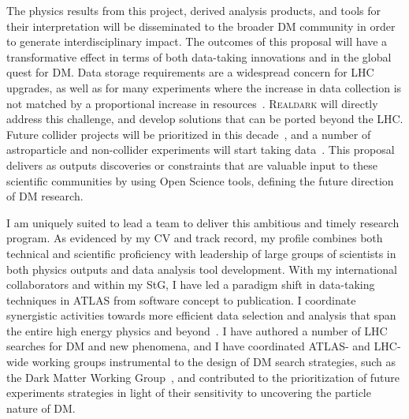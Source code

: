 \documentclass[11pt,a4paper]{article}
\begin{document}
The physics results from this project, derived analysis products, and tools for their interpretation will be disseminated to the broader DM community in order to generate interdisciplinary impact.
The outcomes of this proposal will have a transformative effect in terms of both data-taking innovations and in the global quest for DM. 
Data storage requirements are a widespread concern for LHC upgrades, as well as for many experiments where the increase in data collection is not matched by a proportional increase in resources~\cite{Alves:2017she,Allen:2018yvz}. 
\textsc{Realdark} will directly address this challenge, and develop solutions that can be ported beyond the LHC. 
Future collider projects will be prioritized in this decade~\cite{Strategy:2019vxc}, and a number of astroparticle and non-collider experiments will start taking data~\cite{APPECStrategy,Beacham:2019nyx}. 
This proposal delivers as outputs discoveries or constraints that are valuable input to these scientific communities by using Open Science tools, defining the future direction of DM research. 

I am uniquely suited to lead a team to deliver this ambitious and timely research program.  
As evidenced by my CV and track record, my profile combines both technical and scientific proficiency with leadership of large groups of scientists in both physics outputs and data analysis tool development. 
With my international collaborators and within my StG, I have led a paradigm shift in data-taking techniques in ATLAS from software concept to publication. I coordinate synergistic activities towards more efficient data selection and analysis that span the entire high energy physics and beyond~\cite{Alves:2017she}. I have authored a number of LHC searches for DM and new phenomena, and I have coordinated ATLAS- and LHC-wide working groups instrumental to the design of DM search strategies, such as the Dark Matter Working Group~\cite{DMWGWebsite}, and contributed to the prioritization of future experiments strategies in light of their sensitivity to uncovering the particle nature of DM. 
\end{document}
